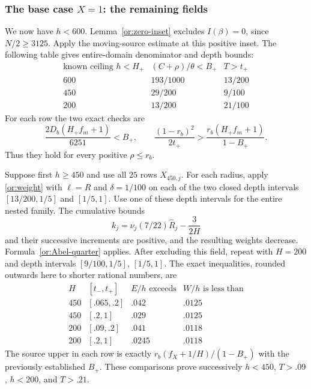 \subsubsection{The base case $X=1$: the remaining fields}

We now have $h<600$.  Lemma~\ref{or:zero-inset} excludes $I(\beta)=0$,
since $N/2\ge3125$.
Apply the moving-source estimate at this positive inset.
The following table gives entire-domain denominator and depth bounds:
\begin{equation}\label{or:base-moving-table}
\begin{array}{c|c|c}
 \text{known ceiling }h<H_+& (C+\rho)/\theta<B_+&T>t_+\\ \hline
 600&193/1000&13/200\\
 450&29/200&9/100\\
 200&13/200&21/100
\end{array}
\end{equation}
For each row the two exact checks are
\[
 \frac{2D_b(H_+f_m+1)}{6251}<B_+,\qquad
 \frac{(1-r_b)^2}{2t_+}>
                   \frac{r_b(H_+f_m+1)}{1-B_+}.
\]
Thus they hold for every positive $\rho\le r_b$.

Suppose first $h\ge450$ and use all $25$ rows $X_{450,j}$.
For each radius, apply \eqref{or:weight} with $\ell=R$ and
$\delta=1/100$ on each of the two closed depth intervals
$[13/200,1/5]$ and $[1/5,1]$.  Use one of these depth intervals
for the entire nested family.  The cumulative bounds
\[
 k_j=\nu_j(7/22)\widehat R_j-\frac{3}{2H}
\]
and their successive increments are positive, and the resulting
weights decrease.  Formula~\eqref{or:Abel-quarter} applies.
After excluding this field, repeat with $H=200$ and depth intervals
$[9/100,1/5]$, $[1/5,1]$.  The exact inequalities, rounded outwards
here to shorter rational numbers, are
\begin{equation}\label{or:base-middle-table}
\begin{array}{c|c|c|c}
 H&[t_-,t_+]&E/h\text{ exceeds}&W/h\text{ is less than}\\ \hline
 450&[.065,.2]&.042&.0125\\
 450&[.2,1]&.029&.0125\\
 200&[.09,.2]&.041&.0118\\
 200&[.2,1]&.0245&.0118
\end{array}
\end{equation}
The source upper in each row is exactly
$r_b(f_X+1/H)/(1-B_+)$ with the previously established $B_+$.
These comparisons prove successively $h<450$, $T>.09$, $h<200$,
and $T>.21$.

